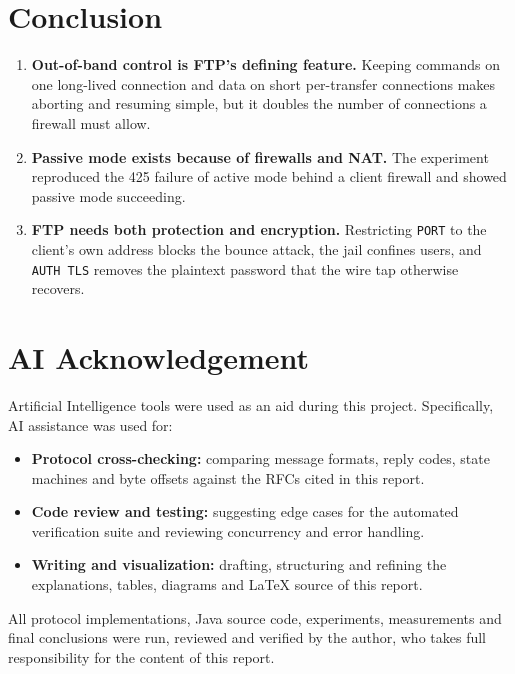\documentclass[11pt,a4paper]{article}
\begin{document}
\section{Conclusion}
\begin{enumerate}[leftmargin=2em]
    \item \textbf{Out-of-band control is FTP's defining feature.} Keeping commands on one long-lived connection and data on short per-transfer connections makes aborting and resuming simple, but it doubles the number of connections a firewall must allow.
    \item \textbf{Passive mode exists because of firewalls and NAT.} The experiment reproduced the 425 failure of active mode behind a client firewall and showed passive mode succeeding.
    \item \textbf{FTP needs both protection and encryption.} Restricting \texttt{PORT} to the client's own address blocks the bounce attack, the jail confines users, and \texttt{AUTH TLS} removes the plaintext password that the wire tap otherwise recovers.
\end{enumerate}

\section*{AI Acknowledgement}
Artificial Intelligence tools were used as an aid during this project. Specifically, AI assistance was used for:
\begin{itemize}[leftmargin=2em]
    \item \textbf{Protocol cross-checking:} comparing message formats, reply codes, state machines and byte offsets against the RFCs cited in this report.
    \item \textbf{Code review and testing:} suggesting edge cases for the automated verification suite and reviewing concurrency and error handling.
    \item \textbf{Writing and visualization:} drafting, structuring and refining the explanations, tables, diagrams and \LaTeX{} source of this report.
\end{itemize}
All protocol implementations, Java source code, experiments, measurements and final conclusions were run, reviewed and verified by the author, who takes full responsibility for the content of this report.
\end{document}
